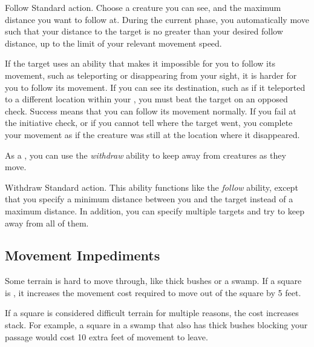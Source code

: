         \begin{activeability}{Follow}
            \abilityusagetime Standard action.
            \rankline
            Choose a creature you can see, and the maximum distance you want to follow at.
            During the current phase, you automatically move such that your distance to the target is no greater than your desired follow distance, up to the limit of your relevant movement speed.

            If the target uses an ability that makes it impossible for you to follow its movement, such as teleporting or disappearing from your sight, it is harder for you to follow its movement.
            If you can see its destination, such as if it teleported to a different location within your , you must beat the target on an opposed  check.
            Success means that you can follow its movement normally.
            If you fail at the initiative check, or if you cannot tell where the target went, you complete your movement as if the creature was still at the location where it disappeared.
        \end{activeability}

         As a , you can use the \textit{withdraw} ability to keep away from creatures as they move.

        \begin{activeability}{Withdraw}
            \abilityusagetime Standard action.
            \rankline
            This ability functions like the \textit{follow} ability, except that you specify a minimum distance between you and the target instead of a maximum distance.
            In addition, you can specify multiple targets and try to keep away from all of them.
        \end{activeability}

    \subsection{Movement Impediments}

        Some terrain is hard to move through, like thick bushes or a swamp.
        If a square is , it increases the movement cost required to move out of the square by 5 feet.

        If a square is considered difficult terrain for multiple reasons, the cost increases stack.
        For example, a square in a swamp that also has thick bushes blocking your passage would cost 10 extra feet of movement to leave.

